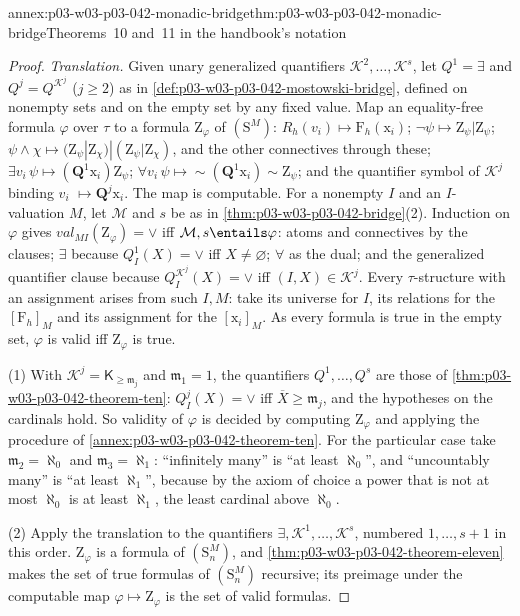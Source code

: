 \begin{annexitem}{annex:p03-w03-p03-042-monadic-bridge}{thm:p03-w03-p03-042-monadic-bridge}{Theorems~10 and~11 in the handbook's notation}
\begin{proof}
\emph{Translation.}  Given unary generalized quantifiers
\(\mathcal K^2,\ldots,\mathcal K^s\), let \(Q^1=\exists\) and
\(Q^j=Q^{\mathcal K^j}\) (\(j\geq2\)) as in
\cref{def:p03-w03-p03-042-mostowski-bridge}, defined on nonempty sets and
on the empty set by any fixed value.  Map an equality-free formula
\(\varphi\) over \(\tau\) to a formula \(\mathrm Z_\varphi\) of
\((\mathrm S^M)\): \(R_h(v_i)\mapsto\mathrm F_h(\mathrm x_i)\);
\(\neg\psi\mapsto\mathrm Z_\psi|\mathrm Z_\psi\);
\(\psi\land\chi\mapsto(\mathrm Z_\psi|\mathrm Z_\chi)|(\mathrm Z_\psi|
\mathrm Z_\chi)\), and the other connectives through these;
\(\exists v_i\,\psi\mapsto(\mathbf Q^1\mathrm x_i)\mathrm Z_\psi\);
\(\forall v_i\,\psi\mapsto{\sim}(\mathbf Q^1\mathrm x_i){\sim}\mathrm
Z_\psi\); and the quantifier symbol of \(\mathcal K^j\) binding \(v_i\)
\(\mapsto\mathbf Q^j\mathrm x_i\).  The map is computable.  For a nonempty
\(I\) and an \(I\)-valuation \(M\), let \(\mathcal M\) and \(s\) be as in
\cref{thm:p03-w03-p03-042-bridge}(2).  Induction on \(\varphi\) gives
\(\mathit{val}_{MI}(\mathrm Z_\varphi)=\vee\) iff \(\mathcal M,s\entails
\varphi\): atoms and connectives by the clauses; \(\exists\) because
\(Q^1_I(X)=\vee\) iff \(X\neq\varnothing\); \(\forall\) as the dual; and
the generalized quantifier clause because \(Q^{\mathcal K^j}_I(X)=\vee\)
iff \((I,X)\in\mathcal K^j\).  Every \(\tau\)-structure with an
assignment arises from such \(I,M\): take its universe for \(I\), its
relations for the \([\mathrm F_h]_M\) and its assignment for the
\([\mathrm x_i]_M\).  As every formula is true in the empty set,
\(\varphi\) is valid iff \(\mathrm Z_\varphi\) is true.

(1) With \(\mathcal K^j=\mathsf K_{\geq\mathfrak m_j}\) and \(\mathfrak
m_1=1\), the quantifiers \(Q^1,\ldots,Q^s\) are those of
\cref{thm:p03-w03-p03-042-theorem-ten}: \(Q^j_I(X)=\vee\) iff
\(\overline X\geq\mathfrak m_j\), and the hypotheses on the cardinals
hold.  So validity of \(\varphi\) is decided by computing \(\mathrm
Z_\varphi\) and applying the procedure of
\cref{annex:p03-w03-p03-042-theorem-ten}.  For the particular case take
\(\mathfrak m_2=\aleph_0\) and \(\mathfrak m_3=\aleph_1\): ``infinitely
many'' is ``at least \(\aleph_0\)'', and ``uncountably many'' is ``at
least \(\aleph_1\)'', because by the axiom of choice a power that is not
at most \(\aleph_0\) is at least \(\aleph_1\), the least cardinal above
\(\aleph_0\).

(2) Apply the translation to the quantifiers \(\exists,\mathcal
K^1,\ldots,\mathcal K^s\), numbered \(1,\ldots,s+1\) in this order.  \(\mathrm
Z_\varphi\) is a formula of \((\mathrm S^M_n)\), and
\cref{thm:p03-w03-p03-042-theorem-eleven} makes the set of true formulas
of \((\mathrm S^M_n)\) recursive; its preimage under the computable map
\(\varphi\mapsto\mathrm Z_\varphi\) is the set of valid formulas.
\end{proof}
\end{annexitem}

